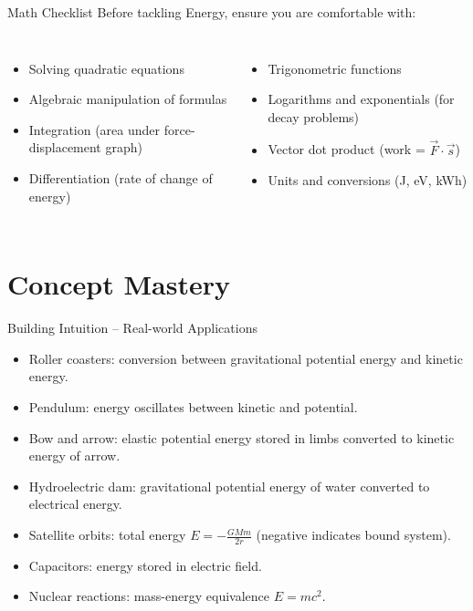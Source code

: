 \documentclass[11pt]{beamer}
\begin{document}
\begin{frame}{Math Checklist}
Before tackling Energy, ensure you are comfortable with:
\begin{columns}[T]
\begin{itemize}
    \item Solving quadratic equations
    \item Algebraic manipulation of formulas
    \item Integration (area under force-displacement graph)
    \item Differentiation (rate of change of energy)
\end{itemize}
\begin{itemize}
    \item Trigonometric functions
    \item Logarithms and exponentials (for decay problems)
    \item Vector dot product (work = $\vec{F}\cdot\vec{s}$)
    \item Units and conversions (J, eV, kWh)
\end{itemize}
\end{columns}
\end{frame}

\section{Concept Mastery}

\begin{frame}{Building Intuition – Real-world Applications}
\begin{itemize}
    \item \alert{Roller coasters}: conversion between gravitational potential energy and kinetic energy.
    \item \alert{Pendulum}: energy oscillates between kinetic and potential.
    \item \alert{Bow and arrow}: elastic potential energy stored in limbs converted to kinetic energy of arrow.
    \item \alert{Hydroelectric dam}: gravitational potential energy of water converted to electrical energy.
    \item \alert{Satellite orbits}: total energy $E = -\frac{GMm}{2r}$ (negative indicates bound system).
    \item \alert{Capacitors}: energy stored in electric field.
    \item \alert{Nuclear reactions}: mass-energy equivalence $E = mc^2$.
\end{itemize}
\end{frame}
\end{document}
